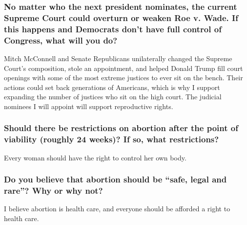 \hypertarget{no-matter-who-the-next-president-nominates-the-current-supreme-court-could-overturn-or-weaken-roe-v-wade-if-this-happens-and-democrats-dont-have-full-control-of-congress-what-will-you-do-6}{%
\subsubsection{No matter who the next president nominates, the current
Supreme Court could overturn or weaken Roe v. Wade. If this happens and
Democrats don't have full control of Congress, what will you
do?}\label{no-matter-who-the-next-president-nominates-the-current-supreme-court-could-overturn-or-weaken-roe-v-wade-if-this-happens-and-democrats-dont-have-full-control-of-congress-what-will-you-do-6}}

Mitch McConnell and Senate Republicans unilaterally changed the Supreme
Court's composition, stole an appointment, and helped Donald Trump fill
court openings with some of the most extreme justices to ever sit on the
bench. Their actions could set back generations of Americans, which is
why I support expanding the number of justices who sit on the high
court. The judicial nominees I will appoint will support reproductive
rights.

\hypertarget{should-there-be-restrictions-on-abortion-after-the-point-of-viability-roughly-24-weeks-if-so-what-restrictions-6}{%
\subsubsection{Should there be restrictions on abortion after the point
of viability (roughly 24 weeks)? If so, what
restrictions?}\label{should-there-be-restrictions-on-abortion-after-the-point-of-viability-roughly-24-weeks-if-so-what-restrictions-6}}

Every woman should have the right to control her own body.

\hypertarget{do-you-believe-that-abortion-should-be-safe-legal-and-rare-why-or-why-not-6}{%
\subsubsection{Do you believe that abortion should be ``safe, legal and
rare''? Why or why
not?}\label{do-you-believe-that-abortion-should-be-safe-legal-and-rare-why-or-why-not-6}}

I believe abortion is health care, and everyone should be afforded a
right to health care.

